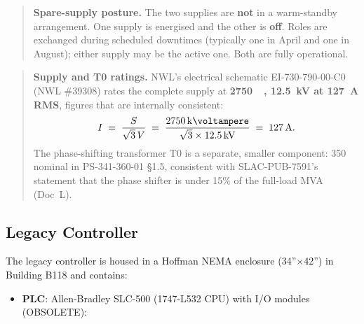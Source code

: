 \begin{quote}
\textbf{Spare-supply posture.} The two supplies are \textbf{not} in a warm-standby arrangement. One supply is energised and the other is \textbf{off}. Roles are exchanged during scheduled downtimes (typically one in April and one in August); either supply may be the active one. Both are fully operational.
\end{quote}

\begin{quote}
\textbf{Supply and T0 ratings.} NWL's electrical schematic EI-730-790-00-C0
(NWL \#39308) rates the complete supply at
\textbf{\qty{2750}{\kilo\voltampere}, \qty{12.5}{\kilo\volt} at
\qty{127}{\ampere} RMS}, figures that are internally consistent:
\[
  I \;=\; \frac{S}{\sqrt{3}\,V}
    \;=\; \frac{\qty{2750}{\kilo\voltampere}}
               {\sqrt{3}\times\qty{12.5}{\kilo\volt}}
    \;=\; \qty{127}{\ampere}.
\]
The phase-shifting transformer T0 is a separate, smaller component:
\qty{350}{\kilo\voltampere} nominal in PS-341-360-01 §1.5, consistent with
SLAC-PUB-7591's statement that the phase shifter is under 15\% of the full-load
MVA (Doc~L).
\end{quote}

\subsection{Legacy Controller}\label{legacy-controller}

The legacy controller is housed in a Hoffman NEMA enclosure (34''×42'') in Building B118 and contains:

\begin{itemize}
\tightlist
\item
  \textbf{PLC}: Allen-Bradley SLC-500 (1747-L532 CPU) with I/O modules (OBSOLETE):
\end{itemize}

